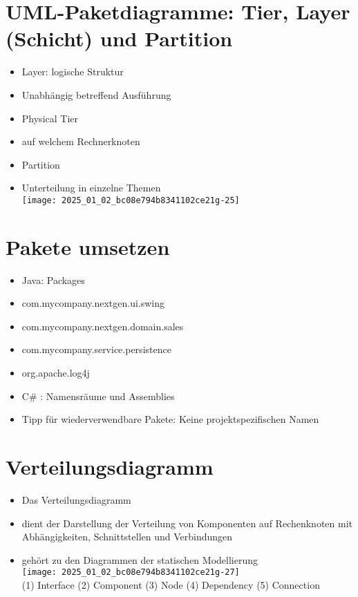 \documentclass[10pt]{article}
\begin{document}
\section*{UML-Paketdiagramme: Tier, Layer (Schicht) und Partition}
\begin{itemize}
  \item Layer: logische Struktur
  \item Unabhängig betreffend Ausführung
  \item Physical Tier
  \item auf welchem Rechnerknoten
  \item Partition
  \item Unterteilung in einzelne Themen\\
\texttt{[image: 2025\_01\_02\_bc08e794b8341102ce21g-25]}
\end{itemize}

\section*{Pakete umsetzen}
\begin{itemize}
  \item Java: Packages
  \item com.mycompany.nextgen.ui.swing
  \item com.mycompany.nextgen.domain.sales
  \item com.mycompany.service.persistence
  \item org.apache.log4j
  \item C\# : Namensräume und Assemblies
  \item Tipp für wiederverwendbare Pakete: Keine projektspezifischen Namen
\end{itemize}

\section*{Verteilungsdiagramm}
\begin{itemize}
  \item Das Verteilungsdiagramm
  \item dient der Darstellung der Verteilung von Komponenten auf Rechenknoten mit Abhängigkeiten, Schnittstellen und Verbindungen
  \item gehört zu den Diagrammen der statischen Modellierung\\
\texttt{[image: 2025\_01\_02\_bc08e794b8341102ce21g-27]}\\
(1) Interface (2) Component (3) Node (4) Dependency (5) Connection
\end{itemize}
\end{document}
